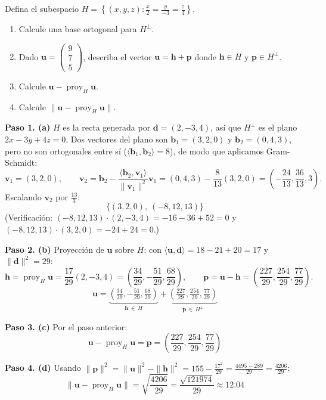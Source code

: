\begin{prob}
Defina el subespacio $H=\left\lbrace (x,y,z) : \frac{x}{2}=\frac{y}{-3}=\frac{z}{4} \right\rbrace$.
\begin{enumerate}
\item Calcule una base ortogonal para $H^{\perp}$.
\item Dado $\mathbf{u}=\begin{pmatrix} 9\\7\\5 \end{pmatrix}$, describa el vector $\mathbf{u}=\mathbf{h}+\mathbf{p}$ donde $\mathbf{h}\in H$ y $\mathbf{p}\in H^{\perp}$.
\item Calcule $\mathbf{u}-\operatorname{proy}_{H}\mathbf{u}$.
\item Calcule $\lVert \mathbf{u}-\operatorname{proy}_{H}\mathbf{u} \rVert$.
\end{enumerate}
\begin{myproof}
\textbf{Paso 1. (a)} $H$ es la recta generada por $\mathbf{d}=(2,-3,4)$, así que $H^{\perp}$ es el plano $2x-3y+4z=0$. Dos vectores del plano son $\mathbf{b}_1=(3,2,0)$ y $\mathbf{b}_2=(0,4,3)$, pero no son ortogonales entre sí ($\langle \mathbf{b}_1,\mathbf{b}_2 \rangle = 8$), de modo que aplicamos Gram-Schmidt:
\[
\mathbf{v}_1 = (3,2,0), \qquad
\mathbf{v}_2 = \mathbf{b}_2 - \frac{\langle \mathbf{b}_2, \mathbf{v}_1 \rangle}{\|\mathbf{v}_1\|^2}\mathbf{v}_1
= (0,4,3) - \frac{8}{13}(3,2,0) = \left(-\frac{24}{13}, \frac{36}{13}, 3\right).
\]
Escalando $\mathbf{v}_2$ por $\tfrac{13}{3}$:
\[
\boxed{\{(3,2,0),\ (-8,12,13)\}}
\]
(Verificación: $(-8,12,13)\cdot(2,-3,4) = -16-36+52 = 0$ y $(-8,12,13)\cdot(3,2,0) = -24+24 = 0$.)

\textbf{Paso 2. (b)} Proyección de $\mathbf{u}$ sobre $H$: con $\langle \mathbf{u},\mathbf{d} \rangle = 18-21+20 = 17$ y $\|\mathbf{d}\|^2 = 29$:
\[
\mathbf{h} = \operatorname{proy}_H \mathbf{u} = \frac{17}{29}(2,-3,4) = \left(\frac{34}{29}, -\frac{51}{29}, \frac{68}{29}\right), \qquad
\mathbf{p} = \mathbf{u} - \mathbf{h} = \left(\frac{227}{29}, \frac{254}{29}, \frac{77}{29}\right).
\]
\[
\boxed{\mathbf{u} = \underbrace{\left(\tfrac{34}{29}, -\tfrac{51}{29}, \tfrac{68}{29}\right)}_{\mathbf{h}\, \in\, H} + \underbrace{\left(\tfrac{227}{29}, \tfrac{254}{29}, \tfrac{77}{29}\right)}_{\mathbf{p}\, \in\, H^{\perp}}}
\]

\textbf{Paso 3. (c)} Por el paso anterior:
\[
\boxed{\mathbf{u} - \operatorname{proy}_H \mathbf{u} = \mathbf{p} = \left(\frac{227}{29}, \frac{254}{29}, \frac{77}{29}\right)}
\]

\textbf{Paso 4. (d)} Usando $\|\mathbf{p}\|^2 = \|\mathbf{u}\|^2 - \|\mathbf{h}\|^2 = 155 - \frac{17^2}{29} = \frac{4495-289}{29} = \frac{4206}{29}$:
\[
\boxed{\lVert \mathbf{u} - \operatorname{proy}_H \mathbf{u} \rVert = \sqrt{\frac{4206}{29}} = \frac{\sqrt{121974}}{29} \approx 12.04}
\]
\end{myproof}
\end{prob}


